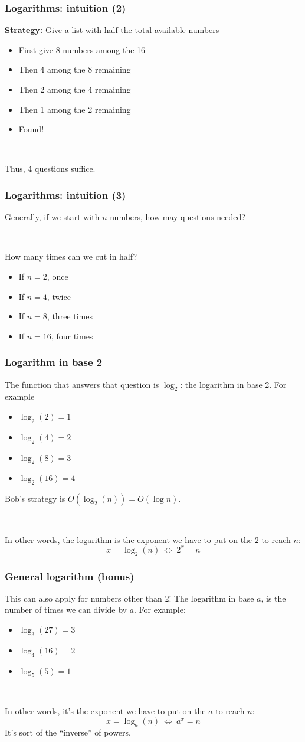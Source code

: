 \documentclass[12pt]{beamer}
\begin{document}
\begin{frame}
\frametitle{Logarithms: intuition (2)}
\textbf{Strategy:} Give a list with half the total available numbers
\begin{itemize}
\item First give 8 numbers among the 16
\item Then 4 among the 8 remaining
\item Then 2 among the 4 remaining
\item Then 1 among the 2 remaining
\item Found!
\end{itemize}

~

Thus, 4 questions suffice.
\end{frame}

\begin{frame}
\frametitle{Logarithms: intuition (3)}
Generally, if we start with $n$ numbers, how may questions needed?

~

How many times can we cut in half?
\begin{itemize}
\item If $n=2$, once
\item If $n=4$, twice
\item If $n=8$, three times
\item If $n=16$, four times
\end{itemize}
\end{frame}

\begin{frame}
\frametitle{Logarithm in base 2}
The function that answers that question is $\log_2$: the logarithm in base 2. For example
\begin{itemize}
\item $\log_2 (2) = 1$
\item $\log_2 (4) = 2$
\item $\log_2 (8) = 3$
\item $\log_2 (16) = 4$
\end{itemize}
Bob's strategy is $O(\log_2(n)) = O(\log n)$.

~

In other words, the logarithm is the exponent we have to put on the 2 to reach $n$:
\[ x = \log_2 (n)\ \Leftrightarrow\ 2^x = n \]
\end{frame}

\begin{frame}
\frametitle{General logarithm (bonus)}
This can also apply for numbers other than 2! The logarithm in base $a$, is the number of times we can divide by $a$. For example:
\begin{itemize}
\item $\log_3(27) = 3$
\item $\log_4(16) = 2$
\item $\log_5(5) = 1$
\end{itemize}

~

In other words, it's the exponent we have to put on the $a$ to reach $n$:
\[ x = \log_a (n)\ \Leftrightarrow\ a^x = n \]
It's sort of the ``inverse'' of powers.
\end{frame}
\end{document}
